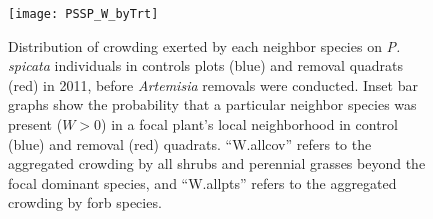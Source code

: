 \documentclass[11pt]{article}
\begin{document}
  \begin{figure}[tbp]
 \centering
 \texttt{[image: PSSP\_W\_byTrt]}
 \caption{Distribution of crowding exerted by each neighbor species on \textit{P. spicata} individuals in controls plots (blue) and removal quadrats (red) in 2011, before \textit{Artemisia}  removals were conducted. Inset bar graphs show the probability that a particular neighbor species was present ($W>0$) in a focal plant's local neighborhood in control (blue) and removal (red) quadrats. ``W.allcov'' refers to the aggregated crowding by all shrubs and perennial grasses beyond the focal dominant species, and ``W.allpts'' refers to the aggregated crowding by forb species.  }
 \label{fig:W-by-treatment}
 \end{figure}
\end{document}

